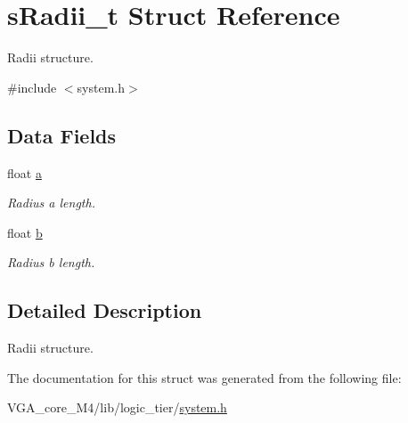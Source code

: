 \hypertarget{structs_radii__t}{}\section{s\+Radii\+\_\+t Struct Reference}
\label{structs_radii__t}


Radii structure.  




{\ttfamily \#include $<$system.\+h$>$}

\subsection*{Data Fields}
\begin{DoxyCompactItemize}
\item 
float \hyperlink{structs_radii__t_a4aec1a5be9d9a4a394a2e49e9744286e}{a}\hypertarget{structs_radii__t_a4aec1a5be9d9a4a394a2e49e9744286e}{}\label{structs_radii__t_a4aec1a5be9d9a4a394a2e49e9744286e}

\begin{DoxyCompactList}\small\item\em Radius a length. \end{DoxyCompactList}\item 
float \hyperlink{structs_radii__t_a83fc1af92e29717b4513d121b0c72c7d}{b}\hypertarget{structs_radii__t_a83fc1af92e29717b4513d121b0c72c7d}{}\label{structs_radii__t_a83fc1af92e29717b4513d121b0c72c7d}

\begin{DoxyCompactList}\small\item\em Radius b length. \end{DoxyCompactList}\end{DoxyCompactItemize}


\subsection{Detailed Description}
Radii structure. 

The documentation for this struct was generated from the following file\+:\begin{DoxyCompactItemize}
\item 
V\+G\+A\+\_\+core\+\_\+\+M4/lib/logic\+\_\+tier/\hyperlink{system_8h}{system.\+h}\end{DoxyCompactItemize}

